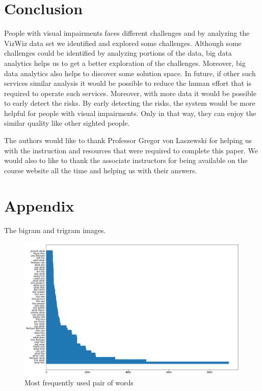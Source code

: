 \documentclass[sigconf]{acmart}
\begin{document}
\section{Conclusion}
People with visual impairments faces different challenges and by analyzing the VizWiz data set we identified and explored some challenges. Although some challenges could be identified by analyzing portions of the data, big data analytics helps us to get a better exploration of the challenges. Moreover, big data analytics also helps to discover some solution space. In future, if other such services similar analysis it would be possible to reduce the human effort that is required to operate such services. Moreover, with more data it would be possible to early detect the risks. By early detecting the risks, the system would be more helpful for people with visual impairments. Only in that way, they can enjoy the similar quality like other sighted people. 
\begin{acks}

The authors would like to thank Professor Gregor von Laszewski for helping us with the instruction and resources that were required to complete this paper. We would also to like to thank the associate instructors for being available on the course website all the time and helping us with their answers.

\end{acks}




 
\newpage
\appendix
\section{Appendix}

The bigram and trigram images. 
\begin{figure}[bp]
        \centering
        \includegraphics[scale=0.45]{images/bigram_all.png}  
        \caption{Most frequently used pair of words} 
          \label{fig:bi_all}   
\end{figure}
\end{document}
